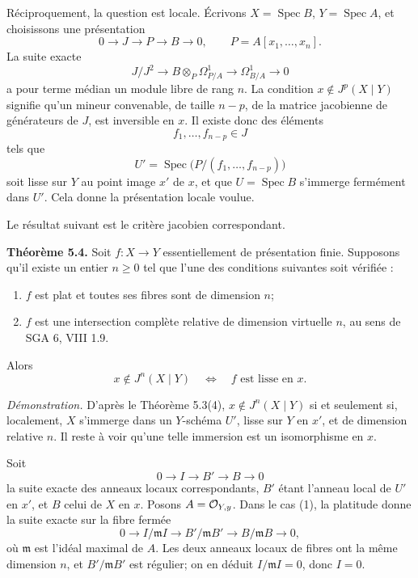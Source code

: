 \documentclass[11pt]{article}
\providecommand{\Spec}{\operatorname{Spec}}
\begin{document}
Réciproquement, la question est locale.  Écrivons \(X=\Spec B\), \(Y=\Spec A\), et choisissons une présentation
\[
        0\longrightarrow J\longrightarrow P\longrightarrow B\longrightarrow 0,
        \qquad
        P=A[x_1,\ldots,x_n].
\]
La suite exacte
\[
        J/J^2\longrightarrow B\otimes_P\Omega^1_{P/A}
        \longrightarrow \Omega^1_{B/A}\longrightarrow 0
\]
a pour terme médian un module libre de rang \(n\).  La condition \(x\notin J^p(X\mid Y)\) signifie qu'un mineur convenable, de taille \(n-p\), de la matrice jacobienne de générateurs de \(J\), est inversible en \(x\).  Il existe donc des éléments
\[
        f_1,\ldots,f_{n-p}\in J
\]
tels que
\[
        U'=\Spec\bigl(P/(f_1,\ldots,f_{n-p})\bigr)
\]
soit lisse sur \(Y\) au point image \(x'\) de \(x\), et que \(U=\Spec B\) s'immerge fermément dans \(U'\).  Cela donne la présentation locale voulue.

Le résultat suivant est le critère jacobien correspondant.

\textbf{Théorème 5.4.}  Soit \(f:X\to Y\) essentiellement de présentation finie.  Supposons qu'il existe un entier \(n\geq 0\) tel que l'une des conditions suivantes soit vérifiée :
\begin{enumerate}[label=(\arabic*)]
\item \(f\) est plat et toutes ses fibres sont de dimension \(n\);
\item \(f\) est une intersection complète relative de dimension virtuelle \(n\), au sens de SGA 6, VIII 1.9.
\end{enumerate}
Alors
\[
        x\notin J^n(X\mid Y)
        \quad\Longleftrightarrow\quad
        f\text{ est lisse en }x.
\]

\emph{Démonstration.}  D'après le Théorème 5.3(4), \(x\notin J^n(X\mid Y)\) si et seulement si, localement, \(X\) s'immerge dans un \(Y\)-schéma \(U'\), lisse sur \(Y\) en \(x'\), et de dimension relative \(n\).  Il reste à voir qu'une telle immersion est un isomorphisme en \(x\).

Soit
\[
        0\longrightarrow I\longrightarrow B'\longrightarrow B\longrightarrow 0
\]
la suite exacte des anneaux locaux correspondants, \(B'\) étant l'anneau local de \(U'\) en \(x'\), et \(B\) celui de \(X\) en \(x\).  Posons \(A=\mathcal O_{Y,y}\).  Dans le cas (1), la platitude donne la suite exacte sur la fibre fermée
\[
        0\longrightarrow I/\mathfrak m I
        \longrightarrow B'/\mathfrak mB'
        \longrightarrow B/\mathfrak mB
        \longrightarrow 0,
\]
où \(\mathfrak m\) est l'idéal maximal de \(A\).  Les deux anneaux locaux de fibres ont la même dimension \(n\), et \(B'/\mathfrak mB'\) est régulier; on en déduit \(I/\mathfrak m I=0\), donc \(I=0\).
\end{document}
